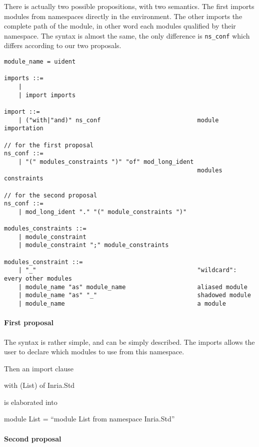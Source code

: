 \documentclass[11pt,a4paper]{article}
\begin{document}
There is actually two possible propositions, with two semantics. The first
imports modules from namespaces directly in the environment. The other imports
the complete path of the module, in other word each modules qualified by their
namespace. The syntax is almost the same, the only difference is
\texttt{ns\_conf} which differs according to our two proposals. 


\begin{verbatim}
module_name = uident

imports ::=
    | 
    | import imports 

import ::=
    | ("with|"and)" ns_conf                           module importation    

// for the first proposal
ns_conf ::=
    | "(" modules_constraints ")" "of" mod_long_ident 
                                                      modules constraints

// for the second proposal
ns_conf ::=
    | mod_long_ident "." "(" module_constraints ")"

modules_constraints ::=
    | module_constraint
    | module_constraint ";" module_constraints

modules_constraint ::=
    | "_"                                             "wildcard": every other modules
    | module_name "as" module_name                    aliased module
    | module_name "as" "_"                            shadowed module
    | module_name                                     a module
\end{verbatim}

\paragraph{First proposal}

The syntax is rather simple, and can be simply described. The imports allows the
user to declare which modules to use from this namespace. 

Then an import clause
\begin{OCaml}
with (List) of Inria.Std
\end{OCaml}
is elaborated into
\begin{OCaml}
module List = ``module List from namespace Inria.Std''
\end{OCaml}

\paragraph{Second proposal}
\end{document}

